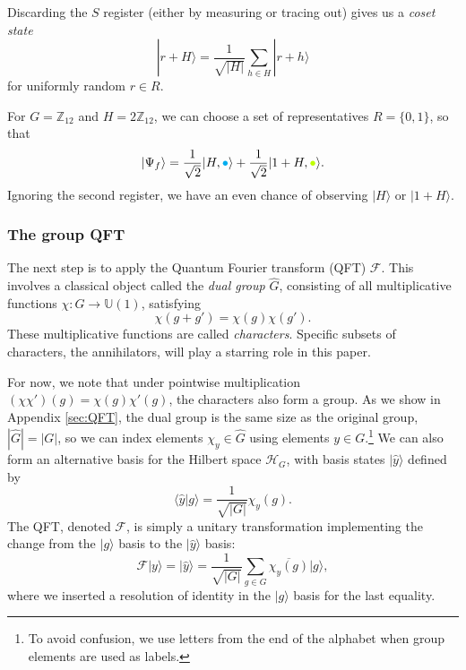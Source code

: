 \documentclass[aps, pre,reprint,nofootinbib,citeautoscript,floatfix]{revtex4-1}
\begin{document}
Discarding the $S$ register (either by measuring or tracing out) gives us a \emph{coset state}
\begin{equation}
    |r+ H\rangle = \frac{1}{\sqrt{|H|}} \sum_{h \in H} |r + h\rangle \label{eq:coset}
\end{equation}
for uniformly random $r \in R$. 

\begin{example} 
For $G = \mathbb{Z}_{12}$ and $H = 2\mathbb{Z}_{12}$, we
can choose a set of representatives $R = \{0, 1\}$, so that
\[
  |\Psi_f\rangle = \frac{1}{\sqrt{2}}|H, \textcolor{cyan}{\bullet}\rangle +
  \frac{1}{\sqrt{2}}|1 + H, \textcolor{lime}{\bullet}\rangle.
\]
Ignoring the second register, we have an even chance of observing
$|H\rangle$ or $|1+H\rangle$.
\end{example}

\subsubsection{The group QFT}

The next step is to apply the Quantum Fourier transform (QFT)
$\mathcal{F}$. 
This involves a classical object called the \emph{dual group} $\hat{G}$,
consisting of all multiplicative functions $\chi: G \to
\mathbb{U}(1)$, satisfying
\begin{equation}
  \label{eq:35}
  \chi(g + g') = \chi(g)\chi(g').
\end{equation}
These multiplicative functions are called \emph{characters}.
Specific subsets of characters, the annihilators, will play a starring role in this paper.

For now, we note that under pointwise multiplication
$(\chi\chi')(g) = \chi(g)\chi'(g)$, the characters also form a group. As we show in Appendix \ref{sec:QFT}, the dual group is the same size as the original
group, $|\hat{G}| = |G|$, so we can index elements $\chi_y \in
\hat{G}$ using elements $y\in G$.\footnote{To avoid confusion, we use letters from the end of the alphabet when group elements are used as labels.}
We can also form an alternative basis for the  Hilbert space $\mathcal{H}_G$, with basis states $|\hat{y}\rangle$ defined by
\begin{equation}
    \langle \hat{y} | g\rangle = \frac{1}{\sqrt{|G|}}\chi_y(g). \label{eq:overlap}
\end{equation}
The QFT, denoted $\mathcal{F}$, is simply a unitary transformation implementing the change from the $|g\rangle$ basis to the $|\hat{y}\rangle$ basis:
\begin{equation}
    \mathcal{F} |y\rangle = |\hat{y}\rangle = \frac{1}{\sqrt{|G|}}\sum_{g\in G}\overline{\chi_y(g)}|g\rangle,
\end{equation}
where we inserted a resolution of identity in the $|g\rangle$ basis for the last equality.
\end{document}
